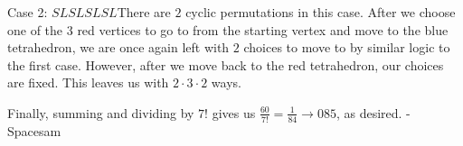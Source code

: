 \begin{enumerate}
 Case 2: $SLSLSLSL$There are $2$ cyclic permutations in this case. After we choose one of the $3$ red vertices to go to from the starting vertex and move to the blue tetrahedron, we are once again left with $2$ choices to move to by similar logic to the first case. However, after we move back to the red tetrahedron, our choices are fixed. This leaves us with $2 \cdot 3 \cdot 2$ ways.

 Finally, summing and dividing by $7!$ gives us $\frac{60}{7!} = \frac{1}{84} \rightarrow \boxed{085}$, as desired. - Spacesam

 


 


 


 


\end{enumerate}